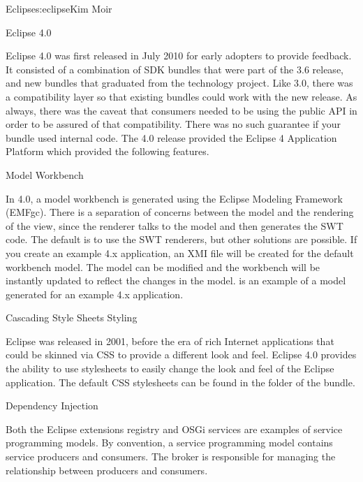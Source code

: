 \begin{aosachapter}{Eclipse}{s:eclipse}{Kim Moir}
\begin{aosasect1}{Eclipse 4.0}

Eclipse 4.0 was first released in July 2010 for early adopters to
provide feedback. It consisted of a combination of SDK bundles that
were part of the 3.6 release, and new bundles that graduated from the
technology project.  Like 3.0, there was a compatibility layer so that
existing bundles could work with the new release. As always, there was
the caveat that consumers needed to be using the public API in order
to be assured of that compatibility.  There was no such guarantee if
your bundle used internal code. The 4.0 release provided the Eclipse 4
Application Platform which provided the following features.

\begin{aosasect2}{Model Workbench}

In 4.0, a model workbench is generated using the Eclipse Modeling
Framework (EMFgc). There is a separation of concerns between the model
and the rendering of the view, since the renderer talks to the model
and then generates the SWT code. The default is to use the SWT
renderers, but other solutions are possible.  If you create an example
4.x application, an XMI file will be created for the default workbench
model. The model can be modified and the workbench will be instantly
updated to reflect the changes in the model. 
is an example of a model generated for an example 4.x application.


\end{aosasect2}

\begin{aosasect2}{Cascading Style Sheets Styling}

Eclipse was released in 2001, before the era of rich Internet
applications that could be skinned via CSS to provide a different look
and feel. Eclipse 4.0 provides the ability to use stylesheets to
easily change the look and feel of the Eclipse application. The
default CSS stylesheets can be found in the  folder of the
 bundle.

\end{aosasect2}

\begin{aosasect2}{Dependency Injection}

Both the Eclipse extensions registry and OSGi services are examples of service
programming models. By convention, a service programming model contains service
producers and consumers. The broker is responsible for managing the
relationship between producers and consumers.


\end{aosasect2}
\end{aosasect1}
\end{aosachapter}
